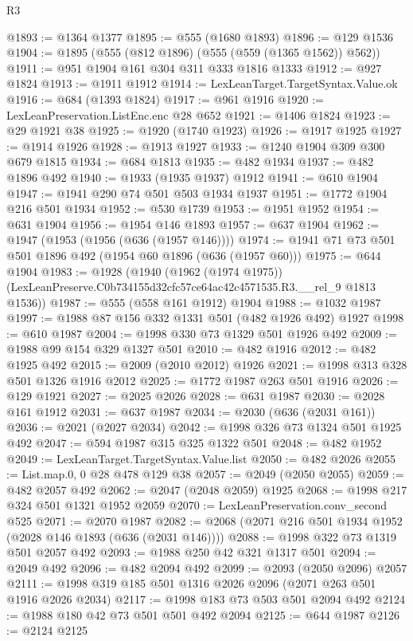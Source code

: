 \begin{lexlean}{R3}
\begin{coremodule}
@1893 := @1364 @1377
@1895 := @555 (@1680 @1893)
@1896 := @129 @1536
@1904 := @1895 (@555 (@812 @1896) (@555 (@559 (@1365 @1562)) @562))
@1911 := @951 @1904 @161 @304 @311 @333 @1816 @1333
@1912 := @927 @1824
@1913 := @1911 @1912
@1914 := LexLeanTarget.TargetSyntax.Value.ok
@1916 := @684 (@1393 @1824)
@1917 := @961 @1916
@1920 := LexLeanPreservation.ListEnc.enc @28 @652
@1921 := @1406 @1824
@1923 := @29 @1921 @38
@1925 := @1920 (@1740 @1923)
@1926 := @1917 @1925
@1927 := @1914 @1926
@1928 := @1913 @1927
@1933 := @1240 @1904 @309 @300 @679 @1815
@1934 := @684 @1813
@1935 := @482 @1934
@1937 := @482 @1896 @492
@1940 := @1933 (@1935 @1937) @1912
@1941 := @610 @1904
@1947 := @1941 @290 @74 @501 @503 @1934 @1937
@1951 := @1772 @1904 @216 @501 @1934
@1952 := @530 @1739
@1953 := @1951 @1952
@1954 := @631 @1904
@1956 := @1954 @146 @1893
@1957 := @637 @1904
@1962 := @1947 (@1953 (@1956 (@636 (@1957 @146))))
@1974 := @1941 @71 @73 @501 @501 @1896 @492 (@1954 @60 @1896 (@636 (@1957 @60)))
@1975 := @644 @1904
@1983 := @1928
    (@1940
      (@1962 (@1974 @1975))
      (LexLeanPreserve.C0b734155d32cfc57ce64ac42c4571535.R3.__rel_9 @1813 @1536))
@1987 := @555 (@558 @161 @1912) @1904
@1988 := @1032 @1987
@1997 := @1988 @87 @156 @332 @1331 @501 (@482 @1926 @492) @1927
@1998 := @610 @1987
@2004 := @1998 @330 @73 @1329 @501 @1926 @492
@2009 := @1988 @99 @154 @329 @1327 @501
@2010 := @482 @1916
@2012 := @482 @1925 @492
@2015 := @2009 (@2010 @2012) @1926
@2021 := @1998 @313 @328 @501 @1326 @1916 @2012
@2025 := @1772 @1987 @263 @501 @1916
@2026 := @129 @1921
@2027 := @2025 @2026
@2028 := @631 @1987
@2030 := @2028 @161 @1912
@2031 := @637 @1987
@2034 := @2030 (@636 (@2031 @161))
@2036 := @2021 (@2027 @2034)
@2042 := @1998 @326 @73 @1324 @501 @1925 @492
@2047 := @594 @1987 @315 @325 @1322 @501
@2048 := @482 @1952
@2049 := LexLeanTarget.TargetSyntax.Value.list
@2050 := @482 @2026
@2055 := List.map.{0, 0} @28 @478 @129 @38
@2057 := @2049 (@2050 @2055)
@2059 := @482 @2057 @492
@2062 := @2047 (@2048 @2059) @1925
@2068 := @1998 @217 @324 @501 @1321 @1952 @2059
@2070 := LexLeanPreservation.conv_second @525
@2071 := @2070 @1987
@2082 := @2068 (@2071 @216 @501 @1934 @1952 (@2028 @146 @1893 (@636 (@2031 @146))))
@2088 := @1998 @322 @73 @1319 @501 @2057 @492
@2093 := @1988 @250 @42 @321 @1317 @501
@2094 := @2049 @492
@2096 := @482 @2094 @492
@2099 := @2093 (@2050 @2096) @2057
@2111 := @1998 @319 @185 @501 @1316 @2026 @2096 (@2071 @263 @501 @1916 @2026 @2034)
@2117 := @1998 @183 @73 @503 @501 @2094 @492
@2124 := @1988 @180 @42 @73 @501 @501 @492 @2094
@2125 := @644 @1987
@2126 := @2124 @2125

\end{coremodule}
\end{lexlean}
